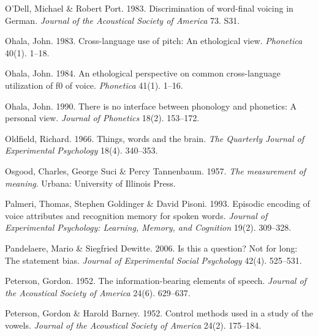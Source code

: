 \documentclass[ number=1
,series=labphon
,output=long
,url=http://langsci-press.org/catalog/book/16
,isbn=978-3-944675-01-5
]{LSP/langsci}
\begin{document}
\begin{thebibliography}{284}
{O'Dell}, Michael \& Robert Port. 1983.
\newblock Discrimination of word-final voicing in {G}erman.
\newblock \emph{Journal of the Acoustical Society of America} 73. S31.

Ohala, John. 1983.
\newblock Cross-language use of pitch: {A}n ethological view.
\newblock \emph{Phonetica} 40(1). 1--18.

Ohala, John. 1984.
\newblock An ethological perspective on common cross-language utilization of f0
  of voice.
\newblock \emph{Phonetica} 41(1). 1--16.

Ohala, John. 1990.
\newblock There is no interface between phonology and phonetics: {A} personal
  view.
\newblock \emph{Journal of Phonetics} 18(2). 153--172.

Oldfield, Richard. 1966.
\newblock Things, words and the brain.
\newblock \emph{The Quarterly Journal of Experimental Psychology} 18(4).
  340--353.

Osgood, Charles, George Suci \& Percy Tannenbaum. 1957.
\newblock \emph{The measurement of meaning}.
\newblock Urbana: University of Illinois Press.

Palmeri, Thomas, Stephen Goldinger \& David Pisoni. 1993.
\newblock Episodic encoding of voice attributes and recognition memory for
  spoken words.
\newblock \emph{Journal of Experimental Psychology: Learning, Memory, and
  Cognition} 19(2). 309--328.

Pandelaere, Mario \& Siegfried Dewitte. 2006.
\newblock Is this a question? {N}ot for long: {T}he statement bias.
\newblock \emph{Journal of Experimental Social Psychology} 42(4). 525--531.

Peterson, Gordon. 1952.
\newblock The information-bearing elements of speech.
\newblock \emph{Journal of the Acoustical Society of America} 24(6). 629--637.

Peterson, Gordon \& Harold Barney. 1952.
\newblock Control methods used in a study of the vowels.
\newblock \emph{Journal of the Acoustical Society of America} 24(2). 175--184.


\end{thebibliography}
\end{document}
